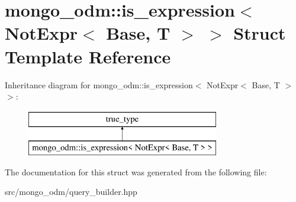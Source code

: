 \hypertarget{structmongo__odm_1_1is__expression_3_01NotExpr_3_01Base_00_01T_01_4_01_4}{}\section{mongo\+\_\+odm\+:\+:is\+\_\+expression$<$ Not\+Expr$<$ Base, T $>$ $>$ Struct Template Reference}
\label{structmongo__odm_1_1is__expression_3_01NotExpr_3_01Base_00_01T_01_4_01_4}
Inheritance diagram for mongo\+\_\+odm\+:\+:is\+\_\+expression$<$ Not\+Expr$<$ Base, T $>$ $>$\+:\begin{figure}[H]
\begin{center}
\leavevmode
\includegraphics[height=2.000000cm]{structmongo__odm_1_1is__expression_3_01NotExpr_3_01Base_00_01T_01_4_01_4}
\end{center}
\end{figure}


The documentation for this struct was generated from the following file\+:\begin{DoxyCompactItemize}
\item 
src/mongo\+\_\+odm/query\+\_\+builder.\+hpp\end{DoxyCompactItemize}
